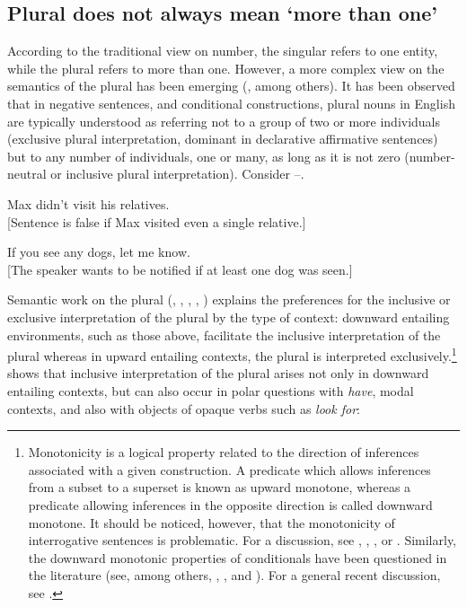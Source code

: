 \documentclass[output=paper,colorlinks,citecolor=brown]{langscibook}
\begin{document}
\subsection{Plural does not always mean `more than one'}\label{sec:geist:2.1}

According to the traditional view on number, the singular refers to one entity, while the plural refers to more than one. However, a more complex view on the semantics of the plural has been emerging (\citealt{Krifka1989}, among others). It has been observed that in negative sentences, and conditional constructions, plural nouns in English are typically understood as referring not to a group of two or more individuals (exclusive plural interpretation, dominant in declarative affirmative sentences) but to any number of individuals, one or many, as long as it is not zero (number-neutral or inclusive plural interpretation). Consider --.

\ea\label{ex:geist:6}
Max didn't visit his relatives.\\
{[}Sentence is false if Max visited even a single relative.{]}
\z

\ea\label{ex:geist:7}
If you see any dogs, let me know.\\
{[}The speaker wants to be notified if at least one dog was seen.{]}
\z

\noindent Semantic work on the plural (\citealt{Sauerland2003}, \citealt{SauerlandYatsushiro2005}, \citealt{Spector2007}, \citealt{Zweig2009}, \citealt{BaleKhanjian2011}) explains the preferences for the inclusive or exclusive interpretation of the plural by the type of context: downward entailing environments, such as those above, facilitate the inclusive interpretation of the plural whereas in upward entailing contexts, the plural is interpreted exclusively.\footnote{Monotonicity is a logical property related to the direction of inferences associated with a given construction. A predicate which allows inferences from a subset to a superset is known as upward monotone, whereas a predicate allowing inferences in the opposite direction is called downward monotone. It should be noticed, however, that the monotonicity of interrogative sentences is problematic. For a discussion, see \citet{Giannakidou1998}, \citet{Gutierrez-Rexach1997}, \citet{Progovac1993}, or \citet{vanderWouden1997}. Similarly, the downward monotonic properties of conditionals have been questioned in the literature (see, among others, \citealt{Gajewski2011}, \citealt{Heim1984}, and \citealt{vonFintel1999}). For a general recent discussion, see \citet{GulgowskiBlaszczak2020}.} \citet{Grimm2013} shows that inclusive interpretation of the plural arises not only in downward entailing contexts, but can also occur in polar questions with \textit{have}, modal contexts, and also with objects of opaque verbs such as \textit{look for}:
\end{document}
